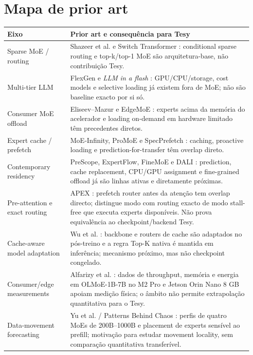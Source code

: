 \section{Mapa de prior art}
\small
\begin{tabularx}{\linewidth}{@{}p{31mm}Y@{}}\toprule
\textbf{Eixo} & \textbf{Prior art e consequência para Tesy}\\\midrule
Sparse MoE / routing & Shazeer et al. e Switch Transformer \cite{shazeer2017moe,fedus2022switch}: conditional sparse routing e top-k/top-1 MoE são arquitetura-base, não contribuição Tesy.\\
Multi-tier LLM & FlexGen e \emph{LLM in a flash} \cite{sheng2023flexgen,alizadeh2024llmflash}: GPU/CPU/storage, cost models e selective loading já existem fora de MoE; não são baseline exacto por si só.\\
Consumer MoE offload & Eliseev--Mazur e EdgeMoE \cite{eliseev2023offloading,yi2023edgemoe}: experts acima da memória do acelerador e loading on-demand em hardware limitado têm precedentes diretos.\\
Expert cache / prefetch & MoE-Infinity, ProMoE e SpecPrefetch \cite{xue2024moeinfinity,song2024promoe,kong2026specprefetch}: caching, proactive loading e prediction-for-transfer têm overlap direto.\\
Contemporary residency & PreScope, ExpertFlow, FineMoE e DALI \cite{yu2025prescope,he2026expertflow,yu2026finemoe,zhu2026dali}: prediction, cache replacement, CPU/GPU assignment e fine-grained offload já são linhas ativas e diretamente próximas.\\
Pre-attention e exact routing & APEX \cite{kanani2026apex}: prefetch router antes da atenção tem overlap directo; distingue modo com routing exacto de modo stall-free que executa experts disponíveis. Não prova equivalência ao checkpoint/backend Tesy.\\
Cache-aware model adaptation & Wu et al. \cite{wu2026cacheaware}: backbone e routers de cache são adaptados no pós-treino e a regra Top-K nativa é mantida em inferência; mecanismo próximo, mas não checkpoint congelado.\\
Consumer/edge measurements & Alfarizy et al. \cite{alfarizy2026consumer}: dados de throughput, memória e energia em OLMoE-1B-7B no M2 Pro e Jetson Orin Nano 8 GB apoiam medição física; o âmbito não permite extrapolação quantitativa para o Tesy.\\
Data-movement forecasting & Yu et al. / Patterns Behind Chaos \cite{yu2026patterns}: perfis de quatro MoEs de 200B--1000B e placement de experts sensível ao prefill; motivação para estudar movement locality, sem comparação quantitativa transferível.\\

\end{tabularx}
